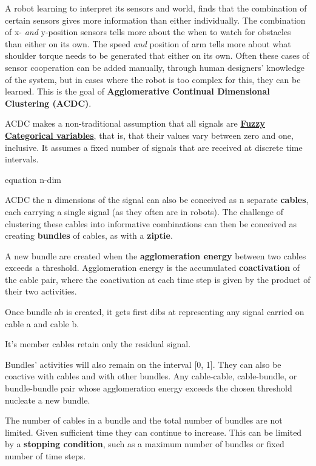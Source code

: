\label{sec:intro}

A robot learning to interpret its sensors and world, finds that the
combination of
certain sensors gives more information than either individually.
The combination of x- \textit{and} y-position sensors tells more about
the when to watch for obstacles than either on its own.
The speed \textit{and} position of arm tells more about what shoulder
torque needs to be generated that either on its own. Often these cases
of sensor cooperation can be added manually, through human designers'
knowledge of the system, but in cases where the robot is too complex
for this, they can be learned. This is the goal of 
\textbf{Agglomerative Continual Dimensional Clustering (ACDC)}.

ACDC makes a non-traditional assumption that all signals are
\textbf{\hyperref[sec:fuzzy]{Fuzzy Categorical variables}}, that is,
that their values vary between
zero and one, inclusive. It assumes a fixed number of signals that are
received at discrete time intervals.

equation n-dim

ACDC the n dimensions of the signal can also be conceived as n separate 
\textbf{cables}, each carrying a single signal (as they often are in robots). The
challenge of clustering these cables into informative combinations
can then be conceived as creating \textbf{bundles} of cables, as with
a \textbf{ziptie}.

A new bundle are created when the \textbf{agglomeration energy}
between two cables exceeds a threshold. Agglomeration energy is the
accumulated \textbf{coactivation} of the cable pair, where the
coactivation at each time step is given by the product of their two
activities.


Once bundle ab is created, it gets first dibs at representing any
signal carried on cable a and cable b.


It's member cables retain only the residual signal.


Bundles' activities will also remain on the interval [0, 1].
They can also be coactive with cables and with other bundles.
Any cable-cable, cable-bundle, or bundle-bundle pair whose
agglomeration energy exceeds the chosen threshold nucleate
a new bundle.

The number of cables in a bundle and the total number of bundles are
not limited. Given sufficient time they can continue to increase.
This can be limited by a \textbf{stopping condition}, such as
a maximum number of bundles or fixed number of time steps.



